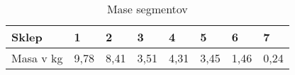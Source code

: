 \begin{table}[]
\centering
\label{table:grav_params}
\begin{tabular}{|l||l|l|l|l|l|l|l|}
\hline
Sklep & 1 & 2 & 3 & 4 & 5 & 6 & 7 \\ \hline
Masa v kg & 9,78 & 8,41 & 3,51 & 4,31 & 3,45 & 1,46 & 0,24 \\ \hline
\end{tabular}
\caption{Mase segmentov}
\end{table}